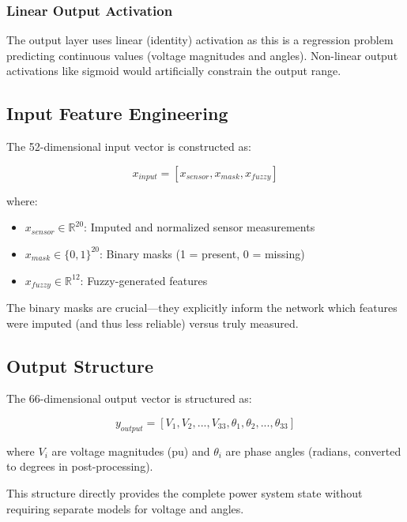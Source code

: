 \documentclass[12pt,a4paper]{report}
\begin{document}
\subsubsection{Linear Output Activation}

The output layer uses linear (identity) activation as this is a regression problem predicting continuous values (voltage magnitudes and angles). Non-linear output activations like sigmoid would artificially constrain the output range.

\subsection{Input Feature Engineering}

The 52-dimensional input vector is constructed as:

\begin{equation}
    x_{input} = [x_{sensor}, x_{mask}, x_{fuzzy}]
\end{equation}

where:
\begin{itemize}
    \item $x_{sensor} \in \mathbb{R}^{20}$: Imputed and normalized sensor measurements
    \item $x_{mask} \in \{0,1\}^{20}$: Binary masks (1 = present, 0 = missing)
    \item $x_{fuzzy} \in \mathbb{R}^{12}$: Fuzzy-generated features
\end{itemize}

The binary masks are crucial—they explicitly inform the network which features were imputed (and thus less reliable) versus truly measured.

\subsection{Output Structure}

The 66-dimensional output vector is structured as:

\begin{equation}
    y_{output} = [V_1, V_2, ..., V_{33}, \theta_1, \theta_2, ..., \theta_{33}]
\end{equation}

where $V_i$ are voltage magnitudes (pu) and $\theta_i$ are phase angles (radians, converted to degrees in post-processing).

This structure directly provides the complete power system state without requiring separate models for voltage and angles.
\end{document}
